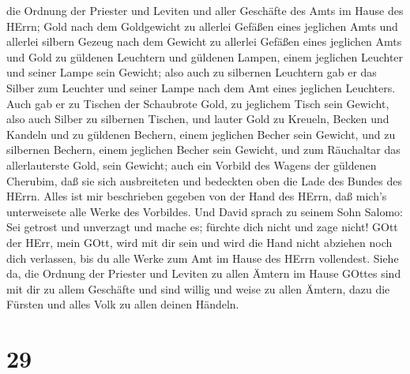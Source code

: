  die Ordnung der Priester und Leviten und aller Geschäfte
des Amts im Hause des HErrn;  Gold nach dem Goldgewicht zu
allerlei Gefäßen eines jeglichen Amts und allerlei silbern Gezeug nach
dem Gewicht zu allerlei Gefäßen eines jeglichen Amts  und
Gold zu güldenen Leuchtern und güldenen Lampen, einem jeglichen Leuchter
und seiner Lampe sein Gewicht; also auch zu silbernen Leuchtern gab er
das Silber zum Leuchter und seiner Lampe nach dem Amt eines jeglichen
Leuchters.  Auch gab er zu Tischen der Schaubrote Gold, zu
jeglichem Tisch sein Gewicht, also auch Silber zu silbernen Tischen,
 und lauter Gold zu Kreueln, Becken und Kandeln und zu
güldenen Bechern, einem jeglichen Becher sein Gewicht, und zu silbernen
Bechern, einem jeglichen Becher sein Gewicht,  und zum
Räuchaltar das allerlauterste Gold, sein Gewicht; auch ein Vorbild des
Wagens der güldenen Cherubim, daß sie sich ausbreiteten und bedeckten
oben die Lade des Bundes des HErrn.  Alles ist mir
beschrieben gegeben von der Hand des HErrn, daß mich's unterweisete alle
Werke des Vorbildes.  Und David sprach zu seinem Sohn
Salomo: Sei getrost und unverzagt und mache es; fürchte dich nicht und
zage nicht! GOtt der HErr, mein GOtt, wird mit dir sein und wird die
Hand nicht abziehen noch dich verlassen, bis du alle Werke zum Amt im
Hause des HErrn vollendest.  Siehe da, die Ordnung der
Priester und Leviten zu allen Ämtern im Hause GOttes sind mit dir zu
allem Geschäfte und sind willig und weise zu allen Ämtern, dazu die
Fürsten und alles Volk zu allen deinen Händeln.

\hypertarget{section-28}{%
\section{29}\label{section-28}}

